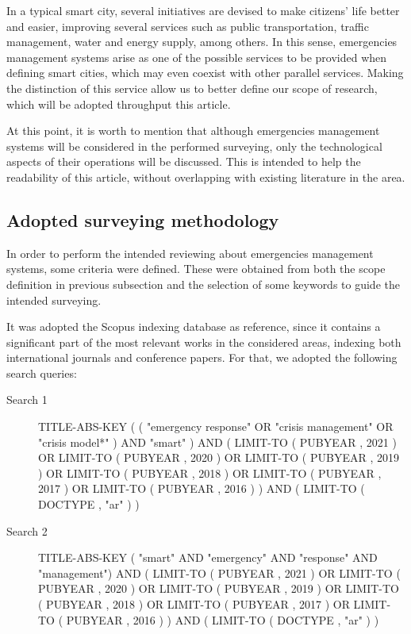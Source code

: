 \begin{refsection}
In a typical smart city, several initiatives are devised to make citizens' life better and easier, improving several services such as public transportation, traffic management, water and energy supply, among others. In this sense, emergencies management systems arise as one of the possible services to be provided when defining smart cities, which may even coexist with other parallel services. Making the distinction of this service allow us to better define our scope of research, which will be adopted throughput this article.

At this point, it is worth to mention that although emergencies management systems will be considered in the performed surveying, only the technological aspects of their operations will be discussed. This is intended to help the readability of this article, without overlapping with existing literature in the area.

\subsection{Adopted surveying methodology}

In order to perform the intended reviewing about emergencies management systems, some criteria were defined. These were obtained from both the scope definition in previous subsection and the selection of some keywords to guide the intended surveying.

It was adopted the Scopus indexing database as reference, since it contains a significant part of the most relevant works in the considered areas, indexing both international journals and conference papers. For that, we adopted the following search queries:

\begin{description}
  \item[Search 1] TITLE-ABS-KEY ( ( "emergency response"  OR  "crisis management"  OR  "crisis model*" )  AND  "smart" )  AND  ( LIMIT-TO ( PUBYEAR ,  2021 )  OR  LIMIT-TO ( PUBYEAR ,  2020 ) OR  LIMIT-TO ( PUBYEAR ,  2019 ) OR  LIMIT-TO ( PUBYEAR ,  2018 )  OR  LIMIT-TO ( PUBYEAR ,  2017 )  OR  LIMIT-TO ( PUBYEAR ,  2016 ) )  AND  ( LIMIT-TO ( DOCTYPE ,  "ar" ) )
  
  \item[Search 2] TITLE-ABS-KEY ( "smart"  AND "emergency"  AND "response"  AND "management")  AND  ( LIMIT-TO ( PUBYEAR ,  2021 )  OR  LIMIT-TO ( PUBYEAR ,  2020 ) OR  LIMIT-TO ( PUBYEAR ,  2019 ) OR  LIMIT-TO ( PUBYEAR ,  2018 )  OR  LIMIT-TO ( PUBYEAR ,  2017 )  OR  LIMIT-TO ( PUBYEAR ,  2016 ) )  AND  ( LIMIT-TO ( DOCTYPE ,  "ar" ) )
\end{description}


\end{refsection}
